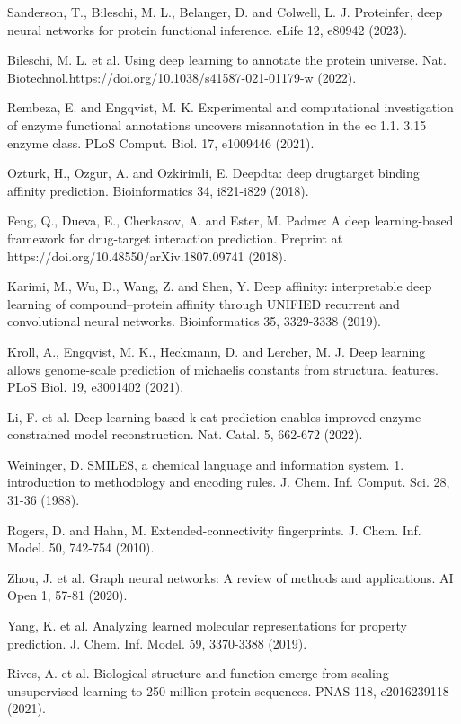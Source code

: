 \documentclass[12pt]{article}
\begin{document}
\begin{thebibliography}{99}
 Sanderson, T., Bileschi, M. L., Belanger, D. and Colwell, L. J. Proteinfer, deep neural networks for protein functional inference. eLife 12, e80942 (2023).

 Bileschi, M. L. et al. Using deep learning to annotate the protein universe. Nat. Biotechnol.https://doi.org/10.1038/s41587-021-01179-w (2022).

 Rembeza, E. and Engqvist, M. K. Experimental and computational investigation of enzyme functional annotations uncovers misannotation in the ec 1.1. 3.15 enzyme class. PLoS Comput. Biol. 17, e1009446 (2021).

 Ozturk, H., Ozgur, A. and Ozkirimli, E. Deepdta: deep drugtarget binding affinity prediction. Bioinformatics 34, i821-i829 (2018).

 Feng, Q., Dueva, E., Cherkasov, A. and Ester, M. Padme: A deep learning-based framework for drug-target interaction prediction. Preprint at https://doi.org/10.48550/arXiv.1807.09741 (2018).

 Karimi, M., Wu, D., Wang, Z. and Shen, Y. Deep affinity: interpretable deep learning of compound–protein affinity through UNIFIED recurrent and convolutional neural networks. Bioinformatics 35, 3329-3338 (2019).

 Kroll, A., Engqvist, M. K., Heckmann, D. and Lercher, M. J. Deep learning allows genome-scale prediction of michaelis constants from structural features. PLoS Biol. 19, e3001402 (2021).

 Li, F. et al. Deep learning-based k cat prediction enables improved enzyme-constrained model reconstruction. Nat. Catal. 5, 662-672 (2022).

 Weininger, D. SMILES, a chemical language and information system. 1. introduction to methodology and encoding rules. J. Chem. Inf. Comput. Sci. 28, 31-36 (1988).

 Rogers, D. and Hahn, M. Extended-connectivity fingerprints. J. Chem. Inf. Model. 50, 742-754 (2010).

 Zhou, J. et al. Graph neural networks: A review of methods and applications. AI Open 1, 57-81 (2020).

 Yang, K. et al. Analyzing learned molecular representations for property prediction. J. Chem. Inf. Model. 59, 3370-3388 (2019).


 Rives, A. et al. Biological structure and function emerge from scaling unsupervised learning to 250 million protein sequences. PNAS 118, e2016239118 (2021).


\end{thebibliography}
\end{document}
